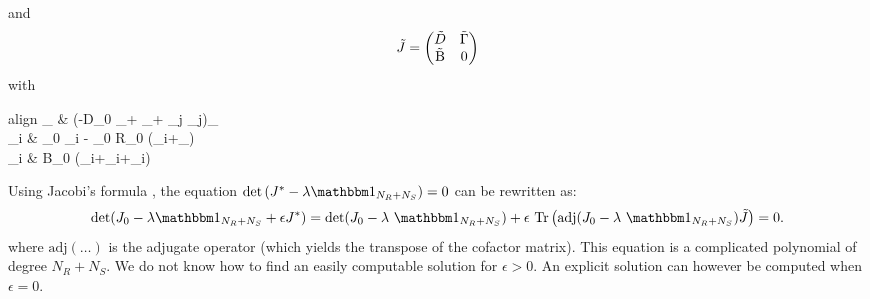 \documentclass[12pt, titlepage, twoside, openright]{report}
\begin{document}
	 and
	 \begin{equation}
	 \tilde{J} = \begin{pmatrix}
	 \tilde{D} & \tilde{\Gamma} \\
	 \tilde{\text{B}} & 0
	 \end{pmatrix}
	 \end{equation}
	 with
	 \begin{empheq}{align}
	 _{\mu \nu} &  \left(-D_0 _\mu + _\mu+  \sum_j \tilde{\alpha}_{\mu j}\right)\delta_{\mu \nu} \\
	 \tilde{\Gamma}_{\mu i} &  \alpha_0 \tilde{\alpha}_{\mu i} - \gamma_0 R_0 \left(\tilde{\gamma}_{i\mu}+_\mu\right) \\
	 _{i \mu} &  B_0 \left(\tilde{\sigma}_{i\mu}+\tilde{\gamma}_{i\mu}+_i\right)
	 \end{empheq}
	Using Jacobi's formula \cite{magnus_matrix_2019}, the equation $\det\left(J^*-\lambda \identity{N_R+N_S}\right)=0$ can be rewritten as:
	\begin{equation}
	{
	\det(J_0-\lambda \identity{N_R+N_S} + \epsilon J^*)=\det(J_0-\lambda \identity{N_R+N_S})+\epsilon \ \trace{\text{adj}(J_0-\lambda \identity{N_R+N_S})\tilde{J}}=0.
	}\label{eq : determinant variance first order}
	\end{equation}
	where $\text{adj}\left(\dots\right)$ is the adjugate operator (\ie which yields the transpose of the cofactor matrix). This equation is a complicated polynomial of degree $N_R+N_S$. We do not know how to find an easily computable solution for $\epsilon > 0$. An explicit solution can however be computed when $\epsilon = 0$.
\end{document}
